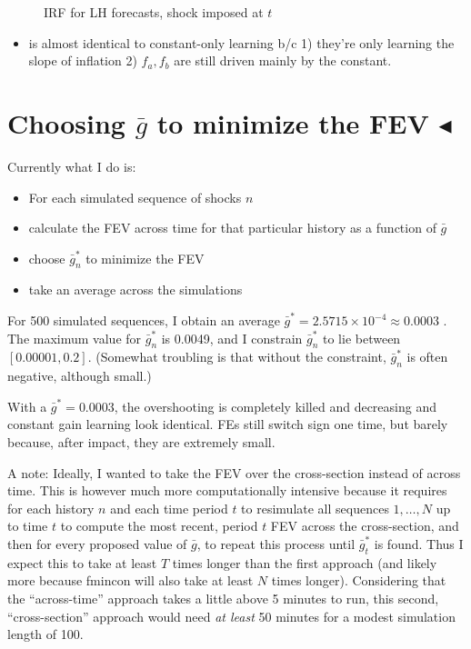 \documentclass[11pt]{article}
\def \myFigPath {../figures/}
\renewcommand{\[}{\begin{equation}}
\renewcommand{\]}{\end{equation}}
\def\myAdjustableFigScale{0.18}
\begin{document}
\begin{figure}[h!]
\caption{IRF for LH forecasts, shock imposed at $t$}
\end{figure}

\begin{itemize}
\item is almost identical to constant-only learning b/c 1) they're only learning the slope of inflation 2) $f_a, f_b$ are still driven mainly by the constant.
\end{itemize}

\newpage
\section{Choosing $\bar{g}$ to minimize the FEV $\blacktriangleleft$}
Currently what I do is:
\begin{itemize}
\item For each simulated sequence of shocks $n$
\item calculate the FEV across time for that particular history as a function of $\bar{g}$
\item choose $\bar{g}^*_n$ to minimize the FEV
\item take an average across the simulations
\end{itemize}
For 500 simulated sequences, I obtain an average $\bar{g}^* = 2.5715 \times 10^{-4} \approx 0.0003$ . The maximum value for $\bar{g}^*_n$ is 0.0049, and I constrain $\bar{g}^*_n$ to lie between $[ 0.00001, 0.2]$. (Somewhat troubling is that without the constraint, $\bar{g}^*_n$ is often negative, although small.)

With a $\bar{g}^* = 0.0003$, the overshooting is completely killed and decreasing and constant gain learning look identical. FEs still switch sign one time, but barely because, after impact, they are extremely small. 

A note: Ideally, I wanted to take the FEV over the cross-section instead of across time. This is however much more computationally intensive because it requires for each history $n$ and each time period $t$ to resimulate all sequences $1,\dots, N$ up to time $t$ to compute the most recent, period $t$ FEV across the cross-section, and then for every proposed value of $\bar{g}$, to repeat this process until $\bar{g}^*_t$ is found. Thus I expect this to take at least $T$ times longer than the first approach (and likely more because fmincon will also take at least $N$ times longer). Considering that the ``across-time'' approach takes a little above 5 minutes to run, this second, ``cross-section'' approach would need \emph{at least} 50 minutes for a modest simulation length of 100. 
\end{document}
